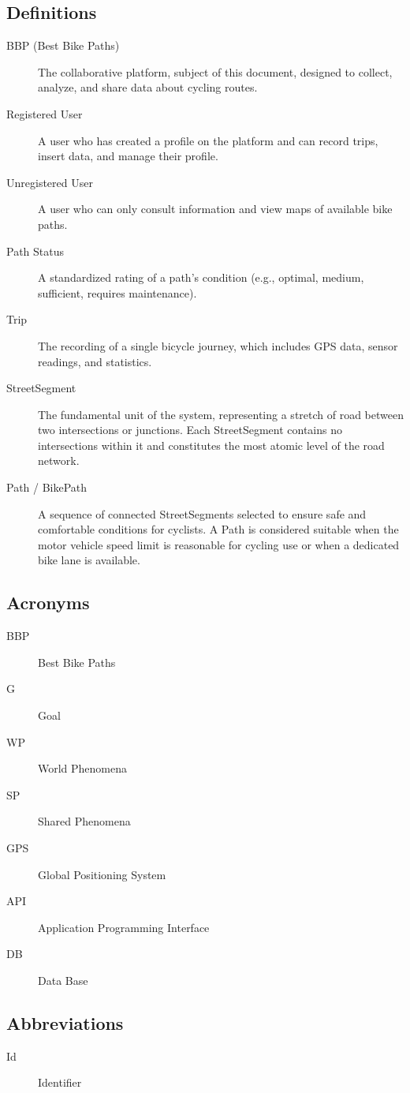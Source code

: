 \subsection{Definitions} \begin{description} \item[BBP (Best Bike Paths)] The collaborative platform, subject of this document, designed to collect, analyze, and share data about cycling routes. \item[Registered User] A user who has created a profile on the platform and can record trips, insert data, and manage their profile. \item[Unregistered User] A user who can only consult information and view maps of available bike paths. \item[Path Status] A standardized rating of a path's condition (e.g., optimal, medium, sufficient, requires maintenance). \item[Trip] The recording of a single bicycle journey, which includes GPS data, sensor readings, and statistics. 
\item[StreetSegment] The fundamental unit of the system, representing a stretch of road between two intersections or junctions. Each StreetSegment contains no intersections within it and constitutes the most atomic level of the road network.

\item[Path / BikePath] A sequence of connected StreetSegments selected to ensure safe and comfortable conditions for cyclists. A Path is considered suitable when the motor vehicle speed limit is reasonable for cycling use or when a dedicated bike lane is available.

\end{description}
\subsection{Acronyms} \begin{description} \item[BBP] Best Bike Paths \item[G] Goal \item[WP] World Phenomena \item[SP] Shared Phenomena\item[GPS] Global Positioning System \item[API] Application Programming Interface \item[DB] Data Base \end{description}
\subsection{Abbreviations} \begin{description} \item[Id] Identifier \end{description}


